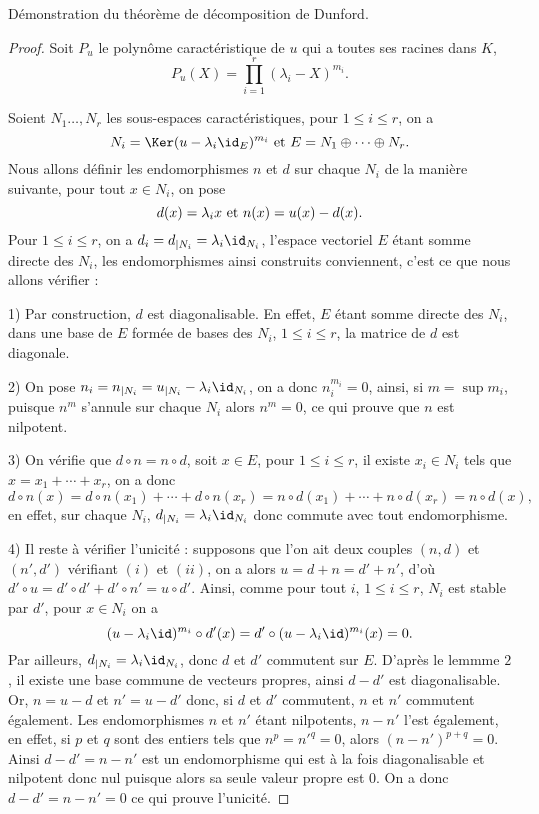 \documentclass[class=report,crop=false]{standalone}
\begin{document}
 Démonstration du théorème de décomposition de Dunford.
\begin{proof}
Soit $P_u$ le polynôme caractéristique de $u$ qui a toutes ses racines dans $K$, 
$$P_u(X)=\prod_{i=1}^r(\lambda_i-X)^{m_i}.$$

Soient $N_1\dots, N_r$ les sous-espaces caractéristiques, pour $1\leq i\leq r$, on a 
$$N_i=\Ker(u-\lambda_i\id_E)^{m_i}\ {\hbox{et}}\ E=N_1\oplus\cdots\oplus N_r.$$
Nous allons définir les endomorphismes $n$ et $d$ sur chaque $N_i$ de la manière suivante, pour tout $x\in N_i$, on pose 
$$d(x)=\lambda_i x\ {\hbox{et}}\ n(x)=u(x)-d(x).$$
Pour $1\leq i\leq r$, on a  $d_i=d_{|N_i}=\lambda_i\id_{N_i}$, l'espace vectoriel $E$ étant somme directe des $N_i$, les endomorphismes ainsi construits conviennent, c'est ce que nous allons vérifier :


1) Par construction, $d$ est diagonalisable. En effet, $E$ étant somme directe des $N_i$, dans une base de $E$ formée de bases des $N_i$, $1\leq i\leq r$, la matrice de $d$ est diagonale.

2) On pose $n_i=n_{|N_i}=u_{|N_i}-\lambda_i\id_{N_i}$, on a donc $n_i^{m_i}=0$, ainsi, si $m=\sup{m_i}$, puisque $n^m$ s'annule sur chaque $N_i$ alors $n^m=0$, ce qui prouve que $n$ est nilpotent.

3) On vérifie que $d\circ n=n\circ d$, soit $x\in E$, pour $1\leq i\leq r$, il existe $x_i\in N_i$ tels que 
$x=x_1+\cdots+x_r$, on a donc
$$d\circ n(x)=d\circ n(x_1)+\cdots+d\circ n(x_r)=n\circ d(x_1)+\cdots+n\circ d(x_r)=n\circ d(x),$$
en effet, sur chaque $N_i$, $d_{|N_i}=\lambda_i\id_{N_i}$ donc commute avec tout endomorphisme.

4) Il reste à vérifier l'unicité : supposons que l'on ait deux couples $(n,d)$ et $(n',d')$ vérifiant $(i)$ et $(ii)$, on a alors $u=d+n=d'+n'$, d'où $d'\circ u=d'\circ d'+d'\circ n'=u\circ d'$. Ainsi, comme pour tout $i$, $1\leq i\leq r$, $N_i$ est stable par $d'$, pour $x\in N_i$ on a
$$(u-\lambda_i\id)^{m_i}\circ d'(x)=d'\circ(u-\lambda_i\id)^{m_i}(x)=0.$$
Par ailleurs, $d_{|N_i}=\lambda_i\id_{N_i}$, donc $d$ et $d'$ commutent sur $E$. D'après le lemmme $2$, il existe une base commune de vecteurs propres, ainsi $d-d'$ est diagonalisable. Or, $n=u-d$ et $n'=u-d'$ donc, si $d$ et $d'$ commutent, $n$ et $n'$ commutent également. Les endomorphismes $n$ et $n'$ étant nilpotents, $n-n'$ l'est également, en effet, si $p$ et $q$ sont des entiers tels que $n^p=n'^q=0$, alors $(n-n')^{p+q}=0$. Ainsi $d-d'=n-n'$ est un endomorphisme qui est à la fois diagonalisable et nilpotent donc nul 
puisque alors sa seule valeur propre est $0$. On a donc $d-d'=n-n'=0$ ce qui prouve l'unicité. 
\end{proof}
\end{document}
